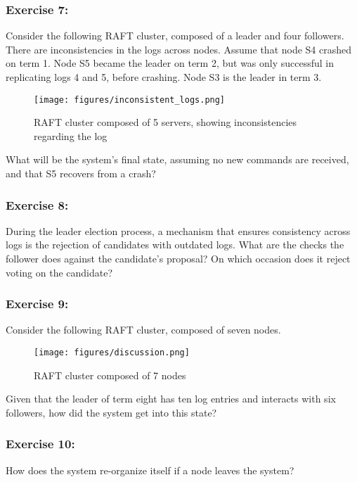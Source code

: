 \documentclass[12pt,a4paper]{article}
\begin{document}
\subsubsection*{Exercise 7:} Consider the following RAFT cluster, composed of a leader and four followers. There are inconsistencies in the logs across nodes. Assume that node S4 crashed on term 1. Node S5 became the leader on term 2, but was only successful in replicating logs 4 and 5, before crashing. Node S3 is the leader in term 3.

\begin{figure}[H]
\centering
\texttt{[image: figures/inconsistent\_logs.png]}
\caption{RAFT cluster composed of 5 servers, showing inconsistencies regarding the log}
\label{fig:inconsistent_logs}
\end{figure}

What will be the system's final state, assuming no new commands are received, and that S5 recovers from a crash?


\subsubsection*{Exercise 8:} During the leader election process, a mechanism that ensures consistency across logs is the rejection of candidates with outdated logs. What are the checks the follower does against the candidate's proposal? On which occasion does it reject voting on the candidate?


\subsubsection*{Exercise 9:} Consider the following RAFT cluster, composed of seven nodes.

\begin{figure}[H]
\centering
\texttt{[image: figures/discussion.png]}
\caption{RAFT cluster composed of 7 nodes}
\label{fig:inconsistent_logs}
\end{figure}

Given that the leader of term eight has ten log entries and interacts with six followers, how did the system get into this state?

\subsubsection*{Exercise 10:} How does the system re-organize itself if a node leaves the system?




\end{document}
